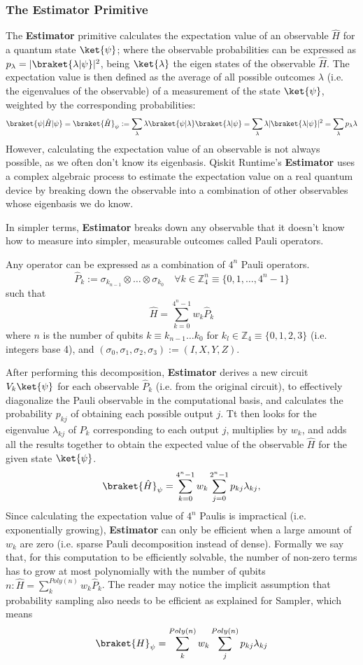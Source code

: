 \documentclass[12pt, oneside]{book}
\theoremstyle{definition}
\theoremstyle{definition}
\theoremstyle{remark}
\begin{document}
\subsubsection{The Estimator Primitive}
The \textbf{Estimator} primitive calculates the expectation value of an observable $\hat{H}$ for a quantum state $\ket{\psi}$; where the observable probabilities can be expressed as $p_{\lambda}=|\braket{\lambda|\psi}|^2$, being $\ket{\lambda}$ the eigen states of the observable $\hat{H}$. The expectation value is then defined as the average of all possible outcomes $\lambda$ (i.e. the eigenvalues of the observable) of a measurement of the state $\ket{\psi}$, weighted by the corresponding probabilities: 
\[
\braket{\psi|\hat{H}|\psi}=\braket{\hat{H}}_{\psi} :=\sum_{\lambda} \lambda\braket{\psi|\lambda}\braket{\lambda|\psi}=\sum_{\lambda} \lambda|\braket{\lambda|\psi}|^2=\sum_{\lambda} p_{\lambda} \lambda
\]
However, calculating the expectation value of an observable is not always possible, as we often don't know its eigenbasis. Qiskit Runtime's \textbf{Estimator} uses a complex algebraic process to estimate the expectation value on a real quantum device by breaking down the observable into a combination of other observables whose eigenbasis we do know.

In simpler terms, \textbf{Estimator} breaks down any observable that it doesn't know how to measure into simpler, measurable outcomes called Pauli operators.

Any operator can be expressed as a combination of $4^n$ Pauli operators.
\[
\hat{P}_k:=\sigma_{k_{n-1}} \otimes \ldots \otimes \sigma_{k_0} \quad \forall k \in \mathbb{Z}_4^n \equiv \{0,1,\ldots, 4^n-1\}
\]
such that
\[
\hat{H}=\sum_{k=0}^{4^n-1} w_k\hat{P}_k
\]
where $n$ is the number of qubits $k\equiv k_{n-1}\ldots k_0$ for $k_l\in\mathbb{Z}_4\equiv \{0,1,2,3\}$ (i.e. integers base 4), and $(\sigma_0,\sigma_1,\sigma_2,\sigma_3) :=(I,X,Y,Z)$.

After performing this decomposition, \textbf{Estimator} derives a new circuit $V_k\ket{\psi}$ for each observable $\hat{P}_k$ (i.e. from the original circuit), to effectively diagonalize the Pauli observable in the computational basis, and calculates the probability $p_{kj}$ of obtaining each possible output $j$. Tt then looks for the eigenvalue $\lambda_{kj}$ of $P_k$ corresponding to each output $j$, multiplies by $w_k$, and adds all the results together to obtain the expected value of the observable $\hat{H}$ for the given state $\ket{\psi}$.
\[
\braket{\hat{H}}_{\psi}=\sum_{k=0}^{4^n-1}w_k\sum_{j=0}^{2^n-1} p_{kj}\lambda_{kj},
\]
Since calculating the expectation value of $4^n$ Paulis is impractical (i.e. exponentially growing), \textbf{Estimator} can only be efficient when a large amount of $w_k$ are zero (i.e. sparse Pauli decomposition instead of dense). Formally we say that, for this computation to be efficiently solvable, the number of non-zero terms has to grow at most polynomially with the number of qubits $n: \hat{H}=\sum_{k}^{Poly(n)} w_k\hat{P}_k$.
The reader may notice the implicit assumption that probability sampling also needs to be efficient as explained for Sampler, which means
\[
\braket{H}_{\psi}=\sum_k^{Poly(n)} w_k\sum_{j}^{Poly(n)}p_{kj}\lambda_{kj}
\]
\end{document}
